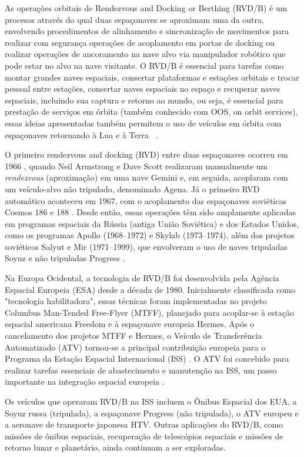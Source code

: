 As operações orbitais de Rendezvous and Docking or Berthing (RVD/B) é um procesos através do qual duas espaçonaves se aproximam uma da outra, envolvendo procedimentos de alinhamento e sincronização de movimentos para realizar com segurança operações de acoplamento em portas de docking ou realizar operações de ancoramento na nave alvo via manipulador robótico que pode estar no alvo na nave visitante. O RVD/B é essencial para tarefas como montar grandes naves espaciais, consertar plataformas e estações orbitais e trocar pessoal entre estações, consertar naves espaciais no espaço e recuperar naves espaciais, incluindo sua captura e retorno ao mundo, ou seja, é essencial para prestação de serviços em órbita (também conhecido com OOS, on orbit services), essas ideias apresentadas também permitem o uso de veículos em órbita com espaçonaves retornando à Lua e à Terra \ \citep{fehse2003}.

O primeiro rendezvous and docking (RVD) entre duas espaçonaves ocorreu em 1966 \citep{nasa1stDocking}, quando Neil Armstrong e Dave Scott realizaram manualmente um \textit{rendezvous} (aproximação) em uma nave Gemini e, em seguida, acoplaram com um veículo-alvo não tripulado, denominado Agena. Já o primeiro RVD automático aconteceu em 1967, com o acoplamento das espaçonaves soviéticas Cosmos 186 e 188 \citep{fehse2003}. Desde então, essas operações têm sido amplamente aplicadas em programas espaciais da Rússia (antiga União Soviética) e dos Estados Unidos, como os programas Apollo (1968–1972) e Skylab (1973–1974), além dos projetos soviéticos Salyut e Mir (1971–1999), que envolveram o uso de naves tripuladas Soyuz e não tripuladas Progress \citep{fehse2003}.

Na Europa Ocidental, a tecnologia de RVD/B foi desenvolvida pela Agência Espacial Europeia (ESA) desde a década de 1980. Inicialmente classificada como "tecnologia habilitadora", essas técnicas foram implementadas no projeto Columbus Man-Tended Free-Flyer (MTFF), planejado para acoplar-se à estação espacial americana Freedom \citep{goelz1992MtffFreedom} e à espaçonave europeia Hermes. Após o cancelamento dos projetos MTFF e Hermes, o Veículo de Transferência Automatizado (ATV) tornou-se a principal contribuição europeia para o Programa da Estação Espacial Internacional (ISS) \citep{ellwood2007ATV2ISS}. O ATV foi concebido para realizar tarefas essenciais de abastecimento e manutenção na ISS, um passo importante na integração espacial europeia \citep{fehse2003}.

Os veículos que operaram RVD/B na ISS incluem o Ônibus Espacial dos EUA, a Soyuz russa (tripulada), a espaçonave Progress (não tripulada), o ATV europeu e a aeronave de transporte japonesa HTV. Outras aplicações do RVD/B, como missões de ônibus espaciais, recuperação de telescópios espaciais e missões de retorno lunar e planetário, ainda continuam a ser exploradas.

